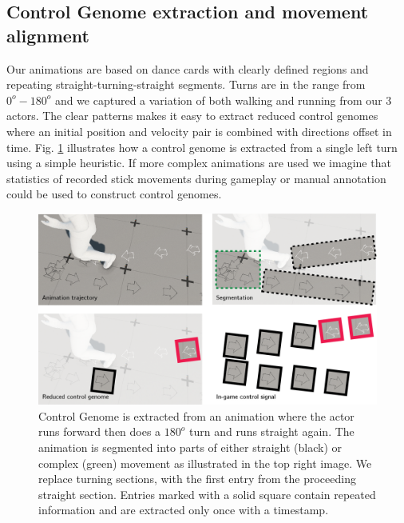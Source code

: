 \subsection{Control Genome extraction and movement alignment}
Our animations are based on dance cards with clearly defined regions and repeating straight-turning-straight segments. Turns are in the range from $0^o-180^o$ and we captured a variation of both walking and running from our 3 actors. The clear patterns makes it easy to extract reduced control genomes where an initial position and velocity pair is combined with directions offset in time. Fig. \ref{fig:results:genome_extraction} illustrates how a control genome is extracted from a single left turn using a simple heuristic. If more complex animations are used we imagine that statistics of recorded stick movements during gameplay or manual annotation could be used to construct control genomes. 
\begin{figure}
    \centering
    \includegraphics[width=1.0\columnwidth]{img/genome_extract.png}
    \caption{Control Genome is extracted from an animation where the actor runs forward then does a $180^o$ turn and runs straight again. The animation is segmented into parts of either straight (black) or complex (green) movement as illustrated in the top right image. We replace turning sections, with the first entry from the proceeding straight section. Entries marked with a solid square contain repeated information and are extracted only once with a timestamp.}
    \label{fig:results:genome_extraction}
\end{figure}

